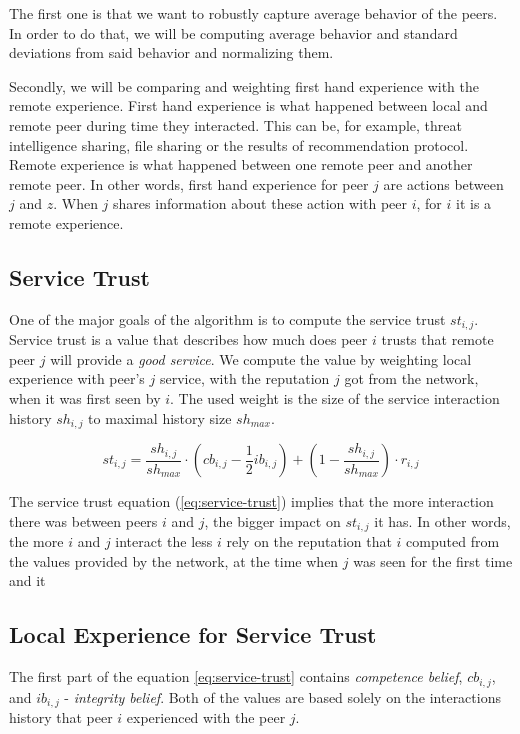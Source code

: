 The first one is that we want to robustly capture average behavior of the peers. In order to do that, we will be computing average behavior and standard deviations from said behavior and normalizing them.

Secondly, we will be comparing and weighting first hand experience with the remote experience. 
First hand experience is what happened between local and remote peer during time they interacted. This can be, for example, threat intelligence sharing, file sharing or the results of recommendation protocol.
Remote experience is what happened between one remote peer and another remote peer. In other words, first hand experience for peer $j$ are actions between $j$ and $z$. When $j$ shares information about these action with peer $i$, for $i$ it is a remote experience.

\subsection{Service Trust}
\label{subsec:service-trust}
One of the major goals of the algorithm is to compute the service trust $st_{i,j}$. 
Service trust is a value that describes how much does peer $i$ trusts that remote peer $j$ will provide a \textit{good service}.
We compute the value by weighting local experience with peer's $j$ service, with the reputation $j$ got from the network, when it was first seen by $i$.
The used weight is the size of the service interaction history $sh_{i,j}$ to maximal history size $sh_{max}$.

\begin{equation}
\label{eq:service-trust}
    st_{i,j}=\frac{sh_{i,j}}{sh_{max}} \cdot \left(cb_{i,j} - \frac{1}{2} ib_{i,j} \right) +\left(1-\frac{sh_{i,j}}{sh_{max}}\right) \cdot r_{i,j}
\end{equation}

The service trust equation (\ref{eq:service-trust}) implies that the more interaction there was between peers $i$ and $j$, the bigger impact on $st_{i,j}$ it has. 
In other words, the more $i$ and $j$ interact the less $i$ rely on the reputation that $i$ computed from the values provided by the network, at the time when $j$ was seen for the first time and it 

\subsection{Local Experience for Service Trust}
The first part of the equation \ref{eq:service-trust} contains \textit{competence belief}, $cb_{i,j}$, and $ib_{i,j}$ - \textit{integrity belief}.
Both of the values are based solely on the interactions history that peer $i$ experienced with the peer $j$.

